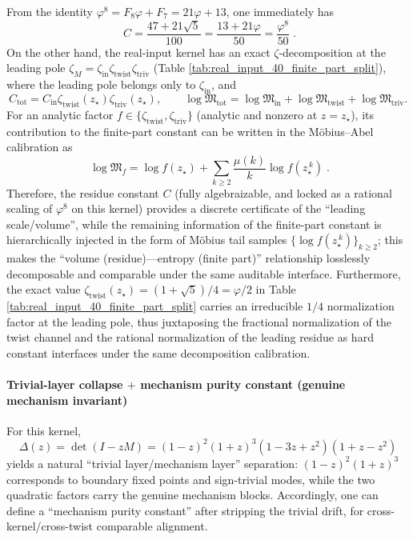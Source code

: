 \begin{remark}\label{rem:chi-ldp-residue-finite-part-layering}
From the identity \(\varphi^{8}=F_{8}\varphi+F_{7}=21\varphi+13\), one immediately has
\[
\boxed{\; C=\frac{47+21\sqrt5}{100}=\frac{13+21\varphi}{50}=\frac{\varphi^{8}}{50}\; }.
\]
On the other hand, the real-input kernel has an exact \(\zeta\)-decomposition at the leading pole
\(
\zeta_M=\zeta_{\mathrm{in}}\zeta_{\mathrm{twist}}\zeta_{\mathrm{triv}}
\)
(Table \ref{tab:real_input_40_finite_part_split}), where the leading pole belongs only to \(\zeta_{\mathrm{in}}\), and
\[
C_{\mathrm{tot}}=C_{\mathrm{in}}\zeta_{\mathrm{twist}}(z_\star)\zeta_{\mathrm{triv}}(z_\star),
\qquad
\log\mathfrak{M}_{\mathrm{tot}}=\log\mathfrak{M}_{\mathrm{in}}+\log\mathfrak{M}_{\mathrm{twist}}+\log\mathfrak{M}_{\mathrm{triv}}.
\]
For an analytic factor \(f\in\{\zeta_{\mathrm{twist}},\zeta_{\mathrm{triv}}\}\) (analytic and nonzero at \(z=z_\star\)), its contribution to the finite-part constant can be written in the M\"obius--Abel calibration as
\[
\boxed{\;
\log\mathfrak{M}_f
=
\log f(z_\star)+\sum_{k\ge 2}\frac{\mu(k)}{k}\log f(z_\star^{\,k})\; }.
\]
Therefore, the residue constant \(C\) (fully algebraizable, and locked as a rational scaling of \(\varphi^{8}\) on this kernel) provides a discrete certificate of the ``leading scale/volume'',
while the remaining information of the finite-part constant is hierarchically injected in the form of M\"obius tail samples \(\{\log f(z_\star^{\,k})\}_{k\ge 2}\); this makes the ``volume (residue)—entropy (finite part)'' relationship losslessly decomposable and comparable under the same auditable interface.
Furthermore, the exact value \(\zeta_{\mathrm{twist}}(z_\star)=(1+\sqrt5)/4=\varphi/2\) in Table \ref{tab:real_input_40_finite_part_split} carries an irreducible \(1/4\) normalization factor at the leading pole, thus juxtaposing the fractional normalization of the twist channel and the rational normalization of the leading residue as hard constant interfaces under the same decomposition calibration.
\end{remark}

\paragraph{Trivial-layer collapse \texorpdfstring{$+$}{+} mechanism purity constant (genuine mechanism invariant)}
For this kernel,
\[
\Delta(z)=\det(I-zM)=(1-z)^2(1+z)^3(1-3z+z^2)(1+z-z^2)
\]
yields a natural ``trivial layer/mechanism layer'' separation: \((1-z)^2(1+z)^3\) corresponds to boundary fixed points and sign-trivial modes, while the two quadratic factors carry the genuine mechanism blocks.
Accordingly, one can define a ``mechanism purity constant'' after stripping the trivial drift, for cross-kernel/cross-twist comparable alignment.

